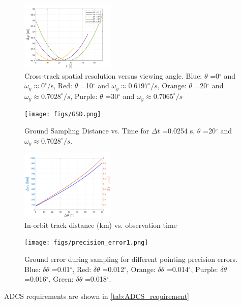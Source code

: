 \begin{figure}[htbp]
  \centering
      \includegraphics[width=0.4\textwidth]{figs/spatial_time_cross.png}
  \caption{Cross-track spatial resolution versus viewing angle. Blue: $\theta$ =0$^{\circ}$ and $\omega_{y}\approx 0^{\circ}$/s, Red: $\theta$ =10$^{\circ}$ and $\omega_{y}\approx 0.6197^{\circ}/s$, Orange: $\theta$ =20$^{\circ}$ and $\omega_{y}\approx 0.7028^{\circ}/s$, Purple: $\theta$ =30$^{\circ}$ and $\omega_{y}\approx 0.7065^{\circ}/s$}
	\label{fig:spatial_time}
\end{figure}
\begin{figure}[htbp]
  \centering
      \texttt{[image: figs/GSD.png]}
  \caption{Ground Sampling Distance vs. Time for $\Delta t$ =0.0254 s, $\theta$ =20$^{\circ}$ and $\omega_{y}\approx 0.7028^{\circ}/s$.}
	\label{fig:GSD}
\end{figure}
\begin{figure}[htbp]
  \centering
      \includegraphics[width=0.4\textwidth]{figs/track_time.png}
  \caption{In-orbit track distance (km) vs. observation time}
	\label{fig:track_time}
\end{figure}
\begin{figure}[htbp]
  \centering
      \texttt{[image: figs/precision\_error1.png]}
  \caption{Ground error during sampling for different pointing precision errors. Blue: $\delta \theta$ =0.01$^{\circ}$, Red: $\delta \theta$ =0.012$^{\circ}$, Orange: $\delta \theta$ =0.014$^{\circ}$, Purple: $\delta \theta$ =0.016$^{\circ}$, Green: $\delta \theta$ =0.018$^{\circ}$.}
	\label{fig:precision_error1}
\end{figure}
ADCS requirements are shown in \ref{tab:ADCS_requirement}
